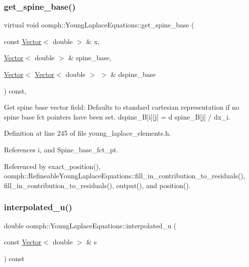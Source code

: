 \subsubsection{\texorpdfstring{get\+\_\+spine\+\_\+base()}{get\_spine\_base()}}
{\footnotesize\ttfamily virtual void oomph\+::\+Young\+Laplace\+Equations\+::get\+\_\+spine\+\_\+base (\begin{DoxyParamCaption}\item[{const \hyperlink{classoomph_1_1Vector}{Vector}$<$ double $>$ \&}]{x,  }\item[{\hyperlink{classoomph_1_1Vector}{Vector}$<$ double $>$ \&}]{spine\+\_\+base,  }\item[{\hyperlink{classoomph_1_1Vector}{Vector}$<$ \hyperlink{classoomph_1_1Vector}{Vector}$<$ double $>$ $>$ \&}]{dspine\+\_\+base }\end{DoxyParamCaption}) const\hspace{0.3cm}{\ttfamily [inline]}, {\ttfamily [virtual]}}



Get spine base vector field\+: Defaults to standard cartesian representation if no spine base fct pointers have been set. dspine\+\_\+B\mbox{[}i\mbox{]}\mbox{[}j\mbox{]} = d spine\+\_\+B\mbox{[}j\mbox{]} / dx\+\_\+i. 



Definition at line 245 of file young\+\_\+laplace\+\_\+elements.\+h.



References i, and Spine\+\_\+base\+\_\+fct\+\_\+pt.



Referenced by exact\+\_\+position(), oomph\+::\+Refineable\+Young\+Laplace\+Equations\+::fill\+\_\+in\+\_\+contribution\+\_\+to\+\_\+residuals(), fill\+\_\+in\+\_\+contribution\+\_\+to\+\_\+residuals(), output(), and position().

\mbox{\label{classoomph_1_1YoungLaplaceEquations_a4839156bf756602298093aa3c0a2f103}} 
\subsubsection{\texorpdfstring{interpolated\+\_\+u()}{interpolated\_u()}}
{\footnotesize\ttfamily double oomph\+::\+Young\+Laplace\+Equations\+::interpolated\+\_\+u (\begin{DoxyParamCaption}\item[{const \hyperlink{classoomph_1_1Vector}{Vector}$<$ double $>$ \&}]{s }\end{DoxyParamCaption}) const\hspace{0.3cm}{\ttfamily [inline]}}



